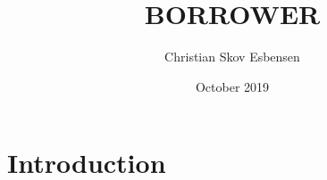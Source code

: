 \documentclass{article}
\title{BORROWER}
\author{Christian Skov Esbensen}
\date{October 2019}
\begin{document}
\maketitle

\section{Introduction}
\end{document}
